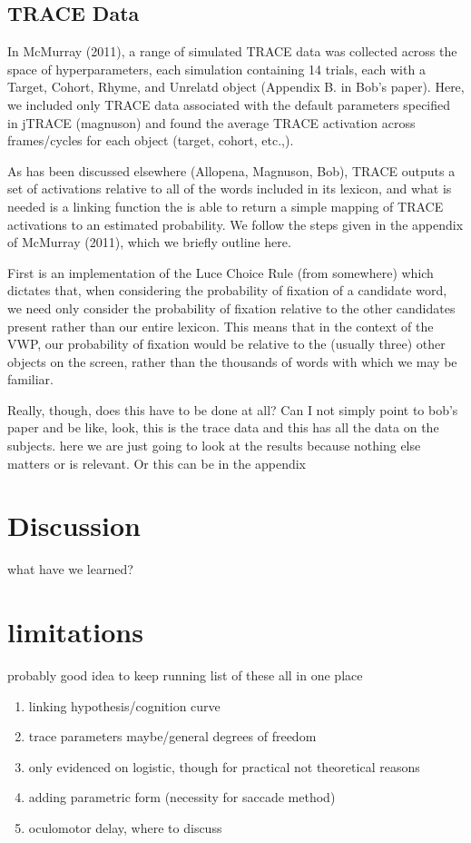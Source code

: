 \documentclass{article}
\begin{document}
\subsection{TRACE Data}

In McMurray (2011), a range of simulated TRACE data was collected across the space of hyperparameters, each simulation containing 14 trials, each with a Target, Cohort, Rhyme, and Unrelatd object (Appendix B. in Bob's paper). Here, we included only TRACE data associated with the default parameters specified in jTRACE (magnuson) and found the average TRACE activation across frames/cycles for each object (target, cohort, etc.,).

As has been discussed elsewhere (Allopena, Magnuson, Bob), TRACE outputs a set of activations relative to all of the words included in its lexicon, and what is needed is a linking function the is able to return a simple mapping of TRACE activations to an estimated probability. We follow the steps given in the appendix of McMurray (2011), which we briefly outline here. 

First is an implementation of the Luce Choice Rule (from somewhere) which dictates that, when considering the probability of fixation of a candidate word, we need only consider the probability of fixation relative to the other candidates present rather than our entire lexicon. This means that in the context of the VWP, our probability of fixation would be relative to the (usually three) other objects on the screen, rather than the thousands of words with which we may be familiar.  

Really, though, does this have to be done at all? Can I not simply point to bob's paper and be like, look, this is the trace data and this has all the data on the subjects. here we are just going to look at the results because nothing else matters or is relevant. Or this can be in the appendix


\section{Discussion}

what have we learned?


\section{limitations}

probably good idea to keep running list of these all in one place

\begin{enumerate}
\item linking hypothesis/cognition curve
\item trace parameters maybe/general degrees of freedom
\item only evidenced on logistic, though for practical not theoretical reasons
\item adding parametric form (necessity for saccade method)
\item oculomotor delay, where to discuss
\end{enumerate}
\end{document}
